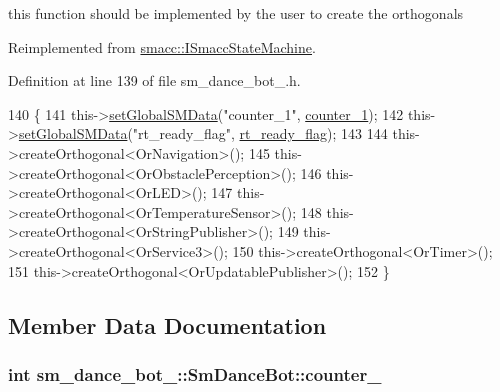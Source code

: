 this function should be implemented by the user to create the orthogonals 



Reimplemented from \hyperlink{classsmacc_1_1ISmaccStateMachine_ac2982c6c8283663e5e1e8a7c82f511ec}{smacc\+::\+I\+Smacc\+State\+Machine}.



Definition at line 139 of file sm\+\_\+dance\+\_\+bot\+\_.\+h.


\begin{DoxyCode}
140     \{
141         this->\hyperlink{classsmacc_1_1ISmaccStateMachine_a8588f9e580fbb95b53e2bd2ca3ff1f98}{setGlobalSMData}(\textcolor{stringliteral}{"counter\_1"}, \hyperlink{structsm__dance__bot__3_1_1SmDanceBot_ad91a1bf0a46ee80bebe007a75cbe429d}{counter\_1});
142         this->\hyperlink{classsmacc_1_1ISmaccStateMachine_a8588f9e580fbb95b53e2bd2ca3ff1f98}{setGlobalSMData}(\textcolor{stringliteral}{"rt\_ready\_flag"}, \hyperlink{structsm__dance__bot__3_1_1SmDanceBot_a3f8e3b6a1b7cb4984e9fe281d84a2ab2}{rt\_ready\_flag});
143 
144         this->createOrthogonal<OrNavigation>();
145         this->createOrthogonal<OrObstaclePerception>();
146         this->createOrthogonal<OrLED>();
147         this->createOrthogonal<OrTemperatureSensor>();
148         this->createOrthogonal<OrStringPublisher>();
149         this->createOrthogonal<OrService3>();
150         this->createOrthogonal<OrTimer>();
151         this->createOrthogonal<OrUpdatablePublisher>();
152     \}
\end{DoxyCode}


\subsection{Member Data Documentation}
\subsubsection[{\texorpdfstring{counter\+\_\+1}{counter_1}}]{\setlength{\rightskip}{0pt plus 5cm}int sm\+\_\+dance\+\_\+bot\+\_\+::\+Sm\+Dance\+Bot\+::counter\+\_}\hypertarget{structsm__dance__bot__3_1_1SmDanceBot_ad91a1bf0a46ee80bebe007a75cbe429d}{}\label{structsm__dance__bot__3_1_1SmDanceBot_ad91a1bf0a46ee80bebe007a75cbe429d}


